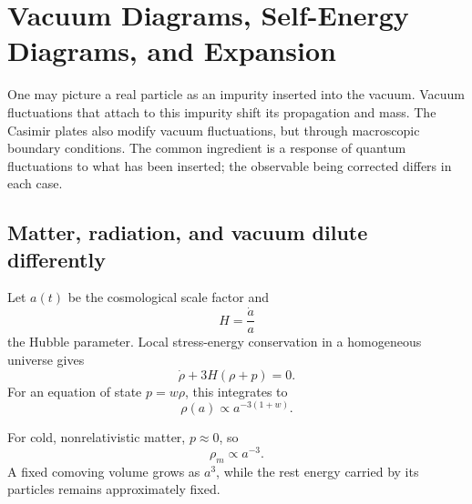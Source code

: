 \section{Vacuum Diagrams, Self-Energy Diagrams, and Expansion}

\begin{classroomqa}
\end{classroomqa}

One may picture a real particle as an impurity inserted into the vacuum. Vacuum fluctuations that attach to this impurity shift its propagation and mass. The Casimir plates also modify vacuum fluctuations, but through macroscopic boundary conditions. The common ingredient is a response of quantum fluctuations to what has been inserted; the observable being corrected differs in each case.

\vspace{-2pt}
\subsection{Matter, radiation, and vacuum dilute differently}

Let \(a(t)\) be the cosmological scale factor and
\begin{equation}
H=\frac{\dot a}{a}
\end{equation}
the Hubble parameter. Local stress-energy conservation in a homogeneous universe gives
\begin{equation}
\dot\rho+3H(\rho+p)=0.
\end{equation}
For an equation of state \(p=w\rho\), this integrates to
\begin{equation}
\rho(a)\propto a^{-3(1+w)}.
\end{equation}

For cold, nonrelativistic matter, \(p\approx0\), so
\begin{equation}
\rho_m\propto a^{-3}.
\end{equation}
A fixed comoving volume grows as \(a^3\), while the rest energy carried by its particles remains approximately fixed.

